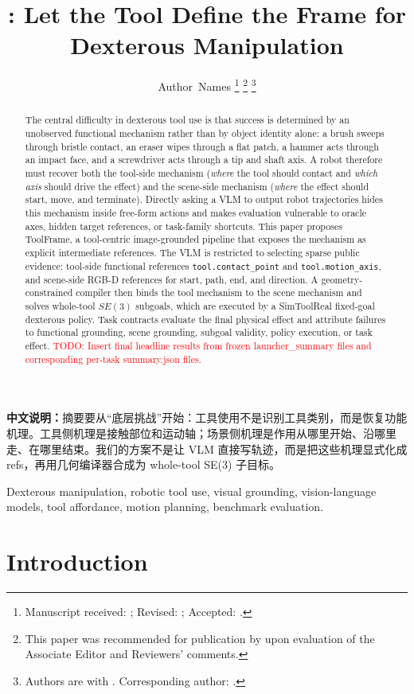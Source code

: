 \documentclass[journal]{IEEEtran}
\title{\method{}: Let the Tool Define the Frame for Dexterous Manipulation}
\author{Author~Names%
\thanks{Manuscript received: \todo{date}; Revised: \todo{date}; Accepted:
\todo{date}.}%
\thanks{This paper was recommended for publication by \todo{Editor} upon
evaluation of the Associate Editor and Reviewers' comments.}%
\thanks{Authors are with \todo{affiliation}. Corresponding author:
\todo{name/email}.}%
}
\newcommand{\todo}[1]{\textcolor{red}{TODO: #1}}
\newcommand{\method}{ToolFrame}
\newcommand{\cn}[1]{\par\smallskip\noindent\textbf{中文说明：}#1\par\smallskip}
\begin{document}
\maketitle

\begin{abstract}
The central difficulty in dexterous tool use is that success is determined by
an unobserved functional mechanism rather than by object identity alone: a
brush sweeps through bristle contact, an eraser wipes through a flat patch, a
hammer acts through an impact face, and a screwdriver acts through a tip and
shaft axis. A robot therefore must recover both the tool-side mechanism
(\emph{where} the tool should contact and \emph{which axis} should drive the
effect) and the scene-side mechanism (\emph{where} the effect should start,
move, and terminate). Directly asking a VLM to output robot trajectories hides
this mechanism inside free-form actions and makes evaluation vulnerable to
oracle axes, hidden target references, or task-family shortcuts. This paper
proposes \method{}, a tool-centric image-grounded pipeline that exposes the
mechanism as explicit intermediate references. The VLM is restricted to
selecting sparse public evidence: tool-side functional references
\texttt{tool.contact\_point} and \texttt{tool.motion\_axis}, and scene-side
RGB-D references for start, path, end, and direction. A geometry-constrained
compiler then binds the tool mechanism to the scene mechanism and solves
whole-tool $SE(3)$ subgoals, which are executed by a SimToolReal fixed-goal
dexterous policy. Task contracts evaluate the final physical effect and
attribute failures to functional grounding, scene grounding, subgoal validity,
policy execution, or task effect. \todo{Insert final headline results from
frozen launcher\_summary files and corresponding per-task summary.json files.}
\end{abstract}

\cn{摘要要从“底层挑战”开始：工具使用不是识别工具类别，而是恢复功能机理。工具侧机理是接触部位和运动轴；场景侧机理是作用从哪里开始、沿哪里走、在哪里结束。我们的方案不是让 VLM 直接写轨迹，而是把这些机理显式化成 refs，再用几何编译器合成为 whole-tool SE(3) 子目标。}

\begin{IEEEkeywords}
Dexterous manipulation, robotic tool use, visual grounding,
vision-language models, tool affordance, motion planning, benchmark evaluation.
\end{IEEEkeywords}

\section{Introduction}
\end{document}
